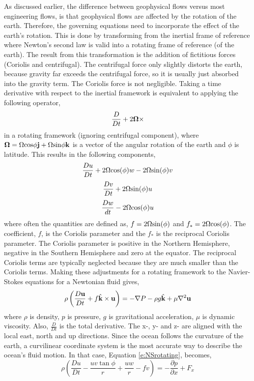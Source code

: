 As discussed earlier, the difference between geophysical flows versus most engineering flows, is that geophysical flows are affected by the rotation of the earth.  Therefore, the governing equations need to incorporate the effect of the earth's rotation.  This is done by transforming from the inertial frame of reference where Newton's second law is valid into a rotating frame of reference (of the earth).  The result from this transformation is the addition of fictitious forces (Coriolis and centrifugal).  The centrifugal force only slightly distorts the earth, because gravity far exceeds the centrifugal force, so it is usually just absorbed into the gravity term.  The Coriolis force is not negligible.  Taking a time derivative with respect to the inertial framework is equivalent to applying the following operator, 
%
\begin{equation*}\label{e:coriolisoperator}
\frac{D}{Dt} + 2 {\bf \Omega}  \times
\end{equation*}
%
in a rotating framework (ignoring centrifugal component), where ${\bf \Omega} = \Omega {\rm cos} \phi {\bf j} + \Omega {\rm sin} \phi {\bf k}$ is a vector of the angular rotation of the earth and $\phi$ is latitude.  This results in the following components, 
%
\begin{equation*}\label{e:accelx}
\frac{Du}{Dt} + 2 \Omega {\rm cos} (\phi) w - 2 \Omega {\rm sin} (\phi) v
\end{equation*}
\begin{equation*}\label{e:accely}
\frac{Dv}{Dt} + 2 \Omega {\rm sin} (\phi) u
\end{equation*}
\begin{equation*}\label{e:accelz}
\frac{Dw}{dt} - 2 \Omega {\rm cos} (\phi) u
\end{equation*}
%
where often the quantities are defined as, $f = 2 \Omega {\rm sin} (\phi)$ and $f_{*} = 2 \Omega {\rm cos} (\phi)$.  The coefficient,  $f$, is the Coriolis parameter and the $f_{*}$ is the reciprocal Coriolis parameter.  The Coriolis parameter is positive in the Northern Hemisphere, negative in the Southern Hemisphere and zero at the equator.  The reciprocal Coriolis terms are typically neglected because they are much smaller than the Coriolis terms.  Making these adjustments for a rotating framework to the Navier-Stokes equations for a Newtonian fluid gives, 
%
\begin{equation}\label{e:NSrotating}
\rho \left( \frac{D {\bf u}}{D t} + f \hat{\bf k} \times {\bf u} \right)= -\nabla P - \rho g \hat{\bf k} + \mu \nabla ^2 {\bf u} 
\end{equation}
%
where $\rho$ is density, $p$ is pressure, $g$ is gravitational acceleration, $\mu$ is dynamic viscosity.  Also, $\frac{D}{Dt}$ is the total derivative.  The x-, y- and z- are aligned with the local east, north and up directions.  Since the ocean follows the curvature of the earth, a curvilinear coordinate system is the most accurate way to describe the ocean's fluid motion.  In that case, Equation \ref{e:NSrotating}, becomes, 
%
\begin{equation}\label{e:xmomc}
    \rho \left ( \frac{Du}{Dt}  -\frac{uv \tan \phi}{r} + \frac{uw}{r}  - f v \right ) = - \frac{\partial p}{\partial x} + F_x
\end{equation}

